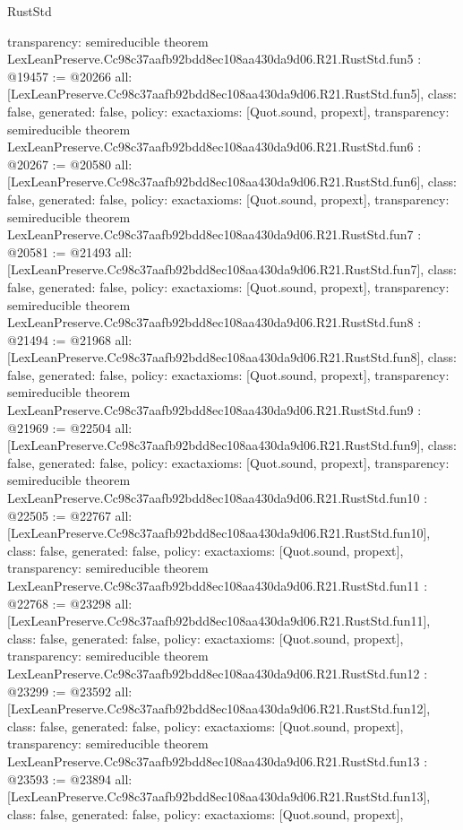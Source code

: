 \begin{lexlean}{RustStd}
\begin{coremodule}
{  transparency: semireducible
}
theorem LexLeanPreserve.Cc98c37aafb92bdd8ec108aa430da9d06.R21.RustStd.fun5 : @19457 := @20266 {
  all: [LexLeanPreserve.Cc98c37aafb92bdd8ec108aa430da9d06.R21.RustStd.fun5],
  class: false,
  generated: false,
  policy: exact{axioms: [Quot.sound, propext]},
  transparency: semireducible
}
theorem LexLeanPreserve.Cc98c37aafb92bdd8ec108aa430da9d06.R21.RustStd.fun6 : @20267 := @20580 {
  all: [LexLeanPreserve.Cc98c37aafb92bdd8ec108aa430da9d06.R21.RustStd.fun6],
  class: false,
  generated: false,
  policy: exact{axioms: [Quot.sound, propext]},
  transparency: semireducible
}
theorem LexLeanPreserve.Cc98c37aafb92bdd8ec108aa430da9d06.R21.RustStd.fun7 : @20581 := @21493 {
  all: [LexLeanPreserve.Cc98c37aafb92bdd8ec108aa430da9d06.R21.RustStd.fun7],
  class: false,
  generated: false,
  policy: exact{axioms: [Quot.sound, propext]},
  transparency: semireducible
}
theorem LexLeanPreserve.Cc98c37aafb92bdd8ec108aa430da9d06.R21.RustStd.fun8 : @21494 := @21968 {
  all: [LexLeanPreserve.Cc98c37aafb92bdd8ec108aa430da9d06.R21.RustStd.fun8],
  class: false,
  generated: false,
  policy: exact{axioms: [Quot.sound, propext]},
  transparency: semireducible
}
theorem LexLeanPreserve.Cc98c37aafb92bdd8ec108aa430da9d06.R21.RustStd.fun9 : @21969 := @22504 {
  all: [LexLeanPreserve.Cc98c37aafb92bdd8ec108aa430da9d06.R21.RustStd.fun9],
  class: false,
  generated: false,
  policy: exact{axioms: [Quot.sound, propext]},
  transparency: semireducible
}
theorem LexLeanPreserve.Cc98c37aafb92bdd8ec108aa430da9d06.R21.RustStd.fun10 : @22505 := @22767 {
  all: [LexLeanPreserve.Cc98c37aafb92bdd8ec108aa430da9d06.R21.RustStd.fun10],
  class: false,
  generated: false,
  policy: exact{axioms: [Quot.sound, propext]},
  transparency: semireducible
}
theorem LexLeanPreserve.Cc98c37aafb92bdd8ec108aa430da9d06.R21.RustStd.fun11 : @22768 := @23298 {
  all: [LexLeanPreserve.Cc98c37aafb92bdd8ec108aa430da9d06.R21.RustStd.fun11],
  class: false,
  generated: false,
  policy: exact{axioms: [Quot.sound, propext]},
  transparency: semireducible
}
theorem LexLeanPreserve.Cc98c37aafb92bdd8ec108aa430da9d06.R21.RustStd.fun12 : @23299 := @23592 {
  all: [LexLeanPreserve.Cc98c37aafb92bdd8ec108aa430da9d06.R21.RustStd.fun12],
  class: false,
  generated: false,
  policy: exact{axioms: [Quot.sound, propext]},
  transparency: semireducible
}
theorem LexLeanPreserve.Cc98c37aafb92bdd8ec108aa430da9d06.R21.RustStd.fun13 : @23593 := @23894 {
  all: [LexLeanPreserve.Cc98c37aafb92bdd8ec108aa430da9d06.R21.RustStd.fun13],
  class: false,
  generated: false,
  policy: exact{axioms: [Quot.sound, propext]},
}
\end{coremodule}
\end{lexlean}
